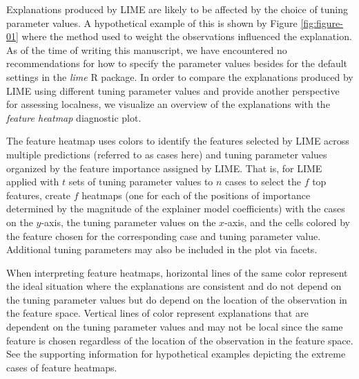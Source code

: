 \documentclass[AMS,STIX2COL]{WileyNJD-v2}\usepackage[]{graphicx}\usepackage[]{color}
\begin{document}
Explanations produced by LIME are likely to be affected by the choice of tuning parameter values. A hypothetical example of this is shown by Figure \ref{fig:figure-01} where the method used to weight the observations influenced the explanation. As of the time of writing this manuscript, we have encountered no recommendations for how to specify the parameter values besides for the default settings in the \emph{lime} R package. In order to compare the explanations produced by LIME using different tuning parameter values and provide another perspective for assessing localness, we visualize an overview of the explanations with the \emph{feature heatmap} diagnostic plot. 

The feature heatmap uses colors to identify the features selected by LIME across multiple predictions (referred to as cases here) and tuning parameter values organized by the feature importance assigned by LIME. That is, for LIME applied with $t$ sets of tuning parameter values to $n$ cases to select the $f$ top features, create $f$ heatmaps (one for each of the positions of importance determined by the magnitude of the explainer model coefficients) with the cases on the $y$-axis, the tuning parameter values on the $x$-axis, and the cells colored by the feature chosen for the corresponding case and tuning parameter value. Additional tuning parameters may also be included in the plot via facets. 

When interpreting feature heatmaps, horizontal lines of the same color represent the ideal situation where the explanations are consistent and do not depend on the tuning parameter values but do depend on the location of the observation in the feature space. Vertical lines of color represent explanations that are dependent on the tuning parameter values and may not be local since the same feature is chosen regardless of the location of the observation in the feature space. See the supporting information for hypothetical examples depicting the extreme cases of feature heatmaps.
\end{document}
